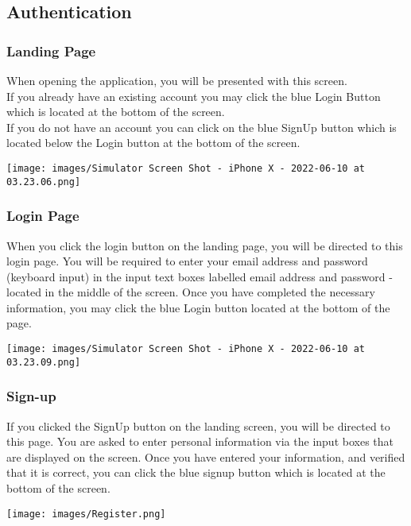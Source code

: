 \documentclass[hidelinks, 12pt, a4paper]{article}
\begin{document}
\subsection{Authentication}
\subsubsection{Landing Page}
When opening the application, you will be presented with this screen. \\
If you already have an existing account you may click the blue Login Button which is located at the bottom of the screen. \\
If you do not have an account you can click on the blue SignUp button which is located below the Login button at the bottom of the screen.
\begin{center}
  \texttt{[image: images/Simulator Screen Shot - iPhone X - 2022-06-10 at 03.23.06.png]}
\end{center}
\subsubsection{Login Page}
When you click the login button on the landing page, you will be directed to this login page. You will be required to enter your email address and password (keyboard input) in the input text boxes labelled email address and password - located in the middle of the screen. Once you have completed the necessary information, you may click the blue Login button located at the bottom of the page.
\begin{center}
  \texttt{[image: images/Simulator Screen Shot - iPhone X - 2022-06-10 at 03.23.09.png]}
\end{center}
\vspace{1cm}
\subsubsection{Sign-up}
If you clicked the SignUp button on the landing screen, you will be directed to this page. You are asked to enter personal information via the input boxes that are displayed on the screen. Once you have entered your information, and verified that it is correct, you can click the blue signup button which is located at the bottom of the screen.
\begin{center}
  \texttt{[image: images/Register.png]}
\end{center}
\vspace{1cm}
\end{document}
